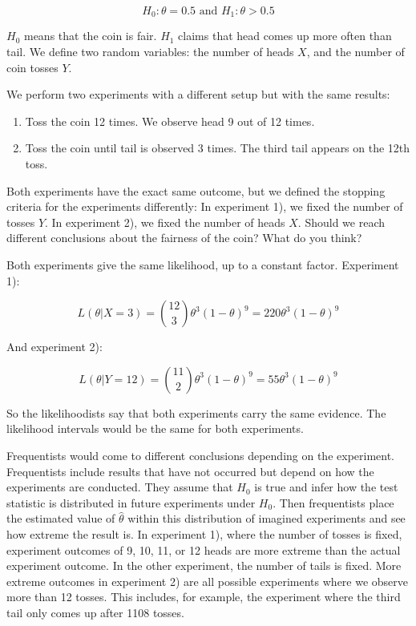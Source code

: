 \documentclass[
  10pt,
]{scrbook}
\providecommand{\tightlist}{%
  \setlength{\itemsep}{0pt}\setlength{\parskip}{0pt}}
\begin{document}
\[H_0: \theta = 0.5 \text{ and } H_1: \theta > 0.5\]

\(H_0\) means that the coin is fair.
\(H_1\) claims that head comes up more often than tail.
We define two random variables: the number of heads \(X\), and the number of coin tosses \(Y\).

We perform two experiments with a different setup but with the same results:

\begin{enumerate}
\def\labelenumi{\arabic{enumi}.}
\tightlist
\item
  Toss the coin 12 times. We observe head 9 out of 12 times.
\item
  Toss the coin until tail is observed 3 times. The third tail appears on the 12th toss.
\end{enumerate}

Both experiments have the exact same outcome, but we defined the stopping criteria for the experiments differently:
In experiment 1), we fixed the number of tosses \(Y\).
In experiment 2), we fixed the number of heads \(X\).
Should we reach different conclusions about the fairness of the coin?
What do you think?

Both experiments give the same likelihood, up to a constant factor. Experiment 1):

\[L(\theta | X = 3) = \binom{12}{3} \theta^3 (1 - \theta)^9  = 220 \theta^3 (1 - \theta)^9 \]

And experiment 2):

\[L(\theta | Y = 12) = \binom{11}{2} \theta^3 (1 - \theta)^9  = 55 \theta^3 (1 - \theta)^9\]

So the likelihoodists say that both experiments carry the same evidence.
The likelihood intervals would be the same for both experiments.

Frequentists would come to different conclusions depending on the experiment.
Frequentists include results that have not occurred but depend on how the experiments are conducted.
They assume that \(H_0\) is true and infer how the test statistic is distributed in future experiments under \(H_0\).
Then frequentists place the estimated value of \(\hat{\theta}\) within this distribution of imagined experiments and see how extreme the result is.
In experiment 1), where the number of tosses is fixed, experiment outcomes of 9, 10, 11, or 12 heads are more extreme than the actual experiment outcome.
In the other experiment, the number of tails is fixed.
More extreme outcomes in experiment 2) are all possible experiments where we observe more than 12 tosses.
This includes, for example, the experiment where the third tail only comes up after 1108 tosses.
\end{document}
